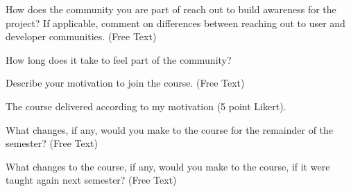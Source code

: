 How does the community you are part of reach out to build awareness for the project? If applicable, comment on differences between reaching out to user and developer communities. (Free Text)

How long does it take to feel part of the community?

Describe your motivation to join the course. (Free Text)

The course delivered according to my motivation (5 point Likert).

What changes, if any, would you make to the course for the remainder of the semester? (Free Text)

What changes to the course, if any, would you make to the course, if it were taught again next semester? (Free Text)